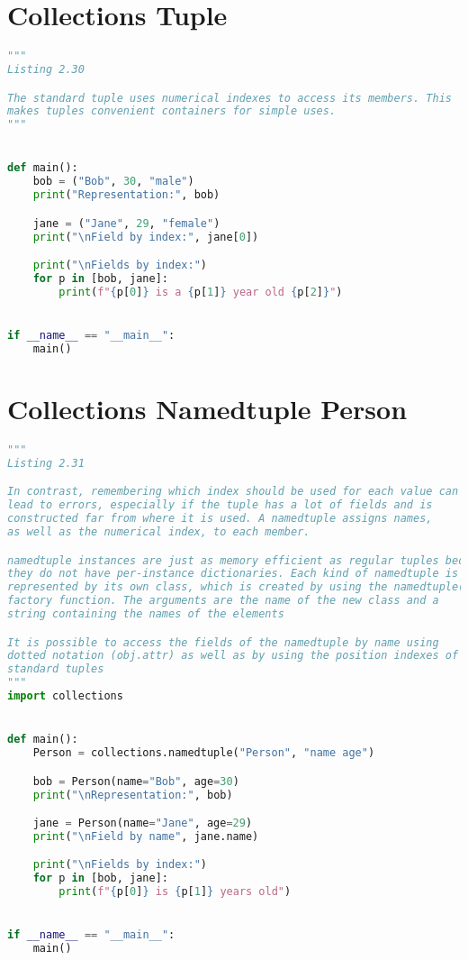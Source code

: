 \documentclass[a4paper,landscape]{report}
\begin{document}
\section{Collections Tuple}
\begin{lstlisting}[language=Python]
"""
Listing 2.30

The standard tuple uses numerical indexes to access its members. This
makes tuples convenient containers for simple uses.
"""


def main():
    bob = ("Bob", 30, "male")
    print("Representation:", bob)

    jane = ("Jane", 29, "female")
    print("\nField by index:", jane[0])

    print("\nFields by index:")
    for p in [bob, jane]:
        print(f"{p[0]} is a {p[1]} year old {p[2]}")


if __name__ == "__main__":
    main()

\end{lstlisting}
\section{Collections Namedtuple Person}
\begin{lstlisting}[language=Python]
"""
Listing 2.31

In contrast, remembering which index should be used for each value can
lead to errors, especially if the tuple has a lot of fields and is
constructed far from where it is used. A namedtuple assigns names,
as well as the numerical index, to each member.

namedtuple instances are just as memory efficient as regular tuples because
they do not have per-instance dictionaries. Each kind of namedtuple is
represented by its own class, which is created by using the namedtuple()
factory function. The arguments are the name of the new class and a
string containing the names of the elements

It is possible to access the fields of the namedtuple by name using
dotted notation (obj.attr) as well as by using the position indexes of
standard tuples
"""
import collections


def main():
    Person = collections.namedtuple("Person", "name age")

    bob = Person(name="Bob", age=30)
    print("\nRepresentation:", bob)

    jane = Person(name="Jane", age=29)
    print("\nField by name", jane.name)

    print("\nFields by index:")
    for p in [bob, jane]:
        print(f"{p[0]} is {p[1]} years old")


if __name__ == "__main__":
    main()

\end{lstlisting}
\end{document}
